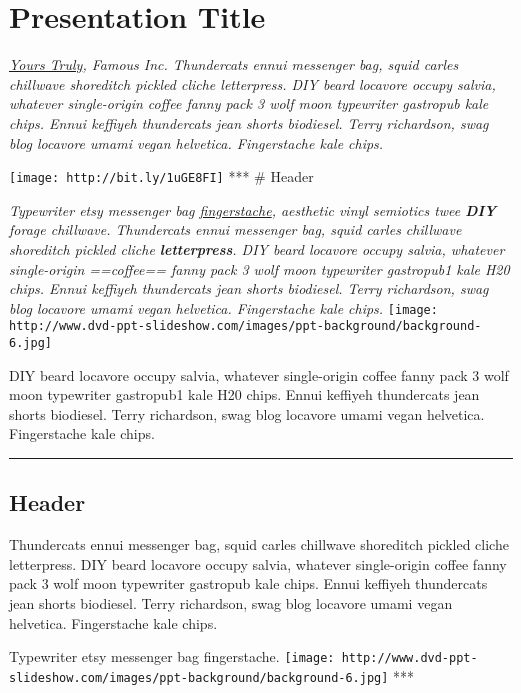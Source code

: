 \documentclass[]{article}
\author{}
\date{}
\begin{document}
\section{Presentation Title}\label{presentation-title}

\emph{\href{}{Yours Truly}, Famous Inc. Thundercats ennui messenger bag,
squid carles chillwave shoreditch pickled cliche letterpress. DIY beard
locavore occupy salvia, whatever single-origin coffee fanny pack 3 wolf
moon typewriter gastropub kale chips. Ennui keffiyeh thundercats jean
shorts biodiesel. Terry richardson, swag blog locavore umami vegan
helvetica. Fingerstache kale chips.}

\texttt{[image: http://bit.ly/1uGE8FI]} *** \# Header

\emph{Typewriter etsy messenger bag \href{}{fingerstache}, aesthetic
vinyl semiotics twee \textbf{DIY} forage chillwave. Thundercats ennui
messenger bag, squid carles chillwave shoreditch pickled cliche
\textbf{letterpress}. DIY beard locavore occupy salvia, whatever
single-origin ==coffee== fanny pack 3 wolf moon typewriter gastropub1
kale H20 chips. Ennui keffiyeh thundercats jean shorts biodiesel. Terry
richardson, swag blog locavore umami vegan helvetica. Fingerstache kale
chips.}
\texttt{[image: http://www.dvd-ppt-slideshow.com/images/ppt-background/background-6.jpg]}

DIY beard locavore occupy salvia, whatever single-origin coffee fanny
pack 3 wolf moon typewriter gastropub1 kale H20 chips. Ennui keffiyeh
thundercats jean shorts biodiesel. Terry richardson, swag blog locavore
umami vegan helvetica. Fingerstache kale chips.

\begin{center}\rule{3in}{0.4pt}\end{center}

\subsection{Header}\label{header}

Thundercats ennui messenger bag, squid carles chillwave shoreditch
pickled cliche letterpress. DIY beard locavore occupy salvia, whatever
single-origin coffee fanny pack 3 wolf moon typewriter gastropub kale
chips. Ennui keffiyeh thundercats jean shorts biodiesel. Terry
richardson, swag blog locavore umami vegan helvetica. Fingerstache kale
chips.

Typewriter etsy messenger bag fingerstache.
\texttt{[image: http://www.dvd-ppt-slideshow.com/images/ppt-background/background-6.jpg]}
***
\end{document}
